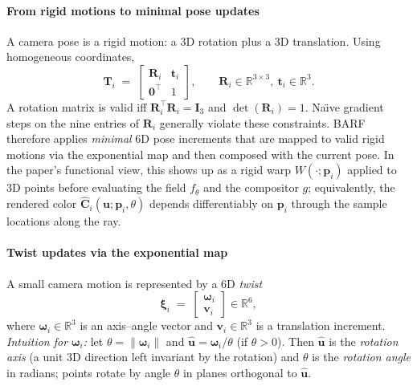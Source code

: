 \begin{enrichment}
\begin{enrichment}
        \paragraph{From rigid motions to minimal pose updates}
        A camera pose is a rigid motion: a 3D rotation plus a 3D translation. Using homogeneous coordinates,
        \[
        \mathbf{T}_i \;=\;
        \begin{bmatrix}
            \mathbf{R}_i & \mathbf{t}_i\\
            \mathbf{0}^\top & 1
        \end{bmatrix},
        \qquad
        \mathbf{R}_i\in\mathbb{R}^{3\times 3},\ \mathbf{t}_i\in\mathbb{R}^3.
        \]
        A rotation matrix is valid iff \(\mathbf{R}_i^\top \mathbf{R}_i=\mathbf{I}_3\) and \(\det(\mathbf{R}_i)=1\).
        Na\"{\i}ve gradient steps on the nine entries of \(\mathbf{R}_i\) generally violate these constraints.
        BARF therefore applies \emph{minimal} 6D pose increments that are mapped to valid rigid motions via the exponential map and then composed with the current pose.
        In the paper’s functional view, this shows up as a rigid warp \(W(\cdot;\mathbf{p}_i)\) applied to 3D points before evaluating the field \(f_\theta\) and the compositor \(g\); equivalently, the rendered color \(\widehat{\mathbf{C}}_i(\mathbf{u};\mathbf{p}_i,\theta)\) depends differentiably on \(\mathbf{p}_i\) through the sample locations along the ray.
        
        \paragraph{Twist updates via the exponential map}
        A small camera motion is represented by a 6D \emph{twist}
        \[
        \boldsymbol{\xi}_i \;=\;
        \begin{bmatrix}\boldsymbol{\omega}_i\\[2pt] \mathbf{v}_i\end{bmatrix}\in\mathbb{R}^6,
        \]
        where \(\boldsymbol{\omega}_i\in\mathbb{R}^3\) is an axis--angle vector and \(\mathbf{v}_i\in\mathbb{R}^3\) is a translation increment.  
        \emph{Intuition for \(\boldsymbol{\omega}_i\):} let \(\theta=\|\boldsymbol{\omega}_i\|\) and \(\hat{\mathbf{u}}=\boldsymbol{\omega}_i/\theta\) (if \(\theta>0\)). Then \(\hat{\mathbf{u}}\) is the \emph{rotation axis} (a unit 3D direction left invariant by the rotation) and \(\theta\) is the \emph{rotation angle} in radians; points rotate by angle \(\theta\) in planes orthogonal to \(\hat{\mathbf{u}}\).
        

\end{enrichment}
\end{enrichment}
